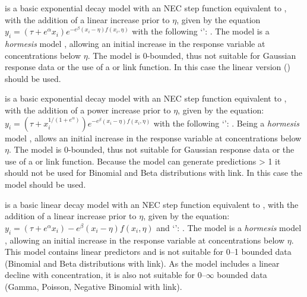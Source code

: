 \documentclass[
  shortnames]{jss}
\newcommand{\cls}[1]{`\code{#1}'}
\begin{document}
 is a basic exponential decay model with an NEC step function equivalent to , with the addition of a linear increase prior to \(\eta\), given by the equation
\(y_i = (\tau + e^{\alpha} x_i) e^{-e^{\beta} \left(x_i - \eta \right) f(x_i, \eta)}\)
with the following \cls{brmsformula}: . The  model is a \emph{hormesis} model \citep{Mattson2008}, allowing an initial increase in the response variable at concentrations below \(\eta\). The model is 0-bounded, thus not suitable for Gaussian response data or the use of a  or  link function. In this case the linear version () should be used.

 is a basic exponential decay model with an NEC step function equivalent to , with the addition of a power increase prior to \(\eta\), given by the equation:
\(y_i = (\tau + x_i^{1/(1+e^{\alpha})}) e^{-e^{\beta} \left(x_i - \eta \right) f(x_i, \eta)}\)
with the following \cls{brmsformula}: . Being a \emph{hormesis} model \citep{Mattson2008},  allows an initial increase in the response variable at concentrations below \(\eta\). The model is 0-bounded, thus not suitable for Gaussian response data or the use of a  or  link function. Because the model can generate predictions \textgreater{} 1 it should not be used for Binomial and Beta distributions with  link. In this case the  model should be used.

 is a basic linear decay model with an NEC step function equivalent to , with the addition of a linear increase prior to \(\eta\), given by the equation:
\(y_i = (\tau + e^{\alpha} x_i) - e^{\beta} \left(x_i - \eta \right) f(x_i, \eta)\)
and \cls{brmsformula}: . The  model is a \emph{hormesis} model \citep{Mattson2008}, allowing an initial increase in the response variable at concentrations below \(\eta\). This model contains linear predictors and is not suitable for 0--1 bounded data (Binomial and Beta distributions with  link). As the model includes a linear decline with concentration, it is also not suitable for 0--\(\infty\) bounded data (Gamma, Poisson, Negative Binomial with  link).
\end{document}
